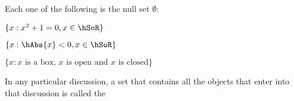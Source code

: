 \documentclass[11pt]{amsbook}
\begin{document}
\begin{exmp} 
	Each one of the following is the null set
	$ \emptyset $:
	
	\begin{hEnumerateArabic}	
		\item
		$ \{ x : x^{2} + 1 = 0 , x \in \hSoR \} $

		\item
		$ \{ x : \hAbs{x} < 0 , x \in \hSoR \} $

		\item
		$ \{ x : x \text{ is a box, } x \text{ is open and } x \text{ is closed} \} $
	\end{hEnumerateArabic} 
\end{exmp}


In any particular discussion, a set that contains all the objects that enter into that discussion is called the 
\end{document}
